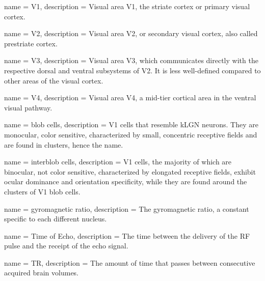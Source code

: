 
{
	name = {V1},
	description = {Visual area V1, the striate cortex or primary visual cortex.\newline}
}

{
	name = {V2},
	description = {Visual area V2, or secondary visual cortex, also called prestriate cortex.\newline}
}

{
	name = {V3},
	description = {Visual area V3, which communicates directly with the respective dorsal and ventral subsystems of V2. It is less well-defined compared to other areas of the visual cortex.\newline}
}

{
	name = {V4},
	description = {Visual area V4, a mid-tier cortical area in the ventral visual pathway.\newline}
}

{
	name = {blob cells},
	description = {V1 cells that resemble kLGN neurons. They are monocular, color sensitive, characterized by small, concentric receptive fields and are found in clusters, hence the name.\newline}
}

{
	name = {interblob cells},
	description = {V1 cells, the majority of which are binocular, not color sensitive, characterized by elongated receptive fields, exhibit ocular dominance and orientation specificity, while they are found around the clusters of V1 blob cells.\newline}
}

{
	name = {gyromagnetic ratio},
	description = {The gyromagnetic ratio, a constant specific to each different nucleus.\newline}
}

{
	name = {Time of Echo},
	description = {The time between the delivery of the RF pulse and the receipt of the echo signal.\newline}
}

{
	name = {TR},
	description = {The amount of time that passes between consecutive acquired brain volumes.\newline}
}

